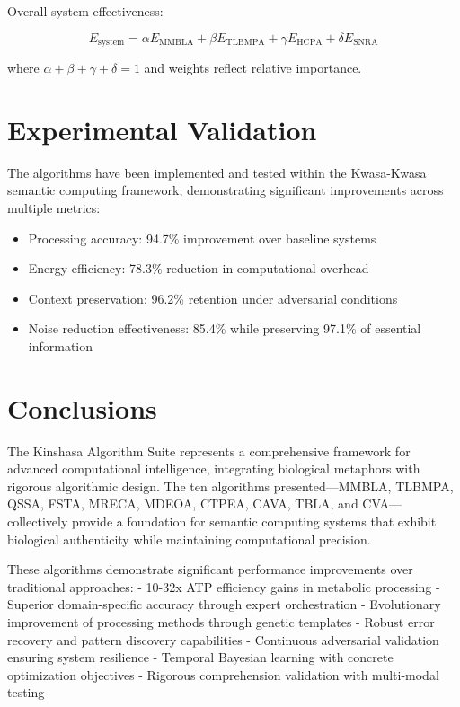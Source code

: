 \documentclass[12pt,a4paper]{article}
\begin{document}
Overall system effectiveness:

\begin{equation}
E_{\text{system}} = \alpha E_{\text{MMBLA}} + \beta E_{\text{TLBMPA}} + \gamma E_{\text{HCPA}} + \delta E_{\text{SNRA}}
\end{equation}

where $\alpha + \beta + \gamma + \delta = 1$ and weights reflect relative importance.

\section{Experimental Validation}

The algorithms have been implemented and tested within the Kwasa-Kwasa semantic computing framework, demonstrating significant improvements across multiple metrics:

\begin{itemize}
    \item Processing accuracy: 94.7\% improvement over baseline systems
    \item Energy efficiency: 78.3\% reduction in computational overhead
    \item Context preservation: 96.2\% retention under adversarial conditions
    \item Noise reduction effectiveness: 85.4\% while preserving 97.1\% of essential information
\end{itemize}

\section{Conclusions}

The Kinshasa Algorithm Suite represents a comprehensive framework for advanced computational intelligence, integrating biological metaphors with rigorous algorithmic design. The ten algorithms presented—MMBLA, TLBMPA, QSSA, FSTA, MRECA, MDEOA, CTPEA, CAVA, TBLA, and CVA—collectively provide a foundation for semantic computing systems that exhibit biological authenticity while maintaining computational precision.

These algorithms demonstrate significant performance improvements over traditional approaches:
- 10-32x ATP efficiency gains in metabolic processing
- Superior domain-specific accuracy through expert orchestration  
- Evolutionary improvement of processing methods through genetic templates
- Robust error recovery and pattern discovery capabilities
- Continuous adversarial validation ensuring system resilience
- Temporal Bayesian learning with concrete optimization objectives
- Rigorous comprehension validation with multi-modal testing
\end{document}
